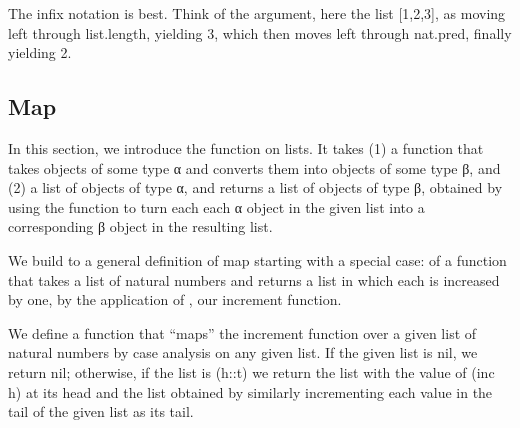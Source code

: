 \documentclass[letterpaper,10pt,english]{sphinxmanual}
\begin{document}
\begin{sphinxVerbatim}[commandchars=\\\{\}]
  \PYG{o}{[}\PYG{o}{]} 
 \PYG{o}{[}\PYG{o}{]}      
            

    \PYG{o}{[}\PYG{o}{]}
    \PYG{o}{[}\PYG{o}{]}
\end{sphinxVerbatim}

\sphinxAtStartPar
The infix notation is best. Think of the argument, here the
list {[}1,2,3{]}, as moving left through list.length, yielding 3,
which then moves left through nat.pred, finally yielding 2.


\subsection{Map}
\label{\detokenize{A_03_Recursive_Types:map}}
\sphinxAtStartPar
In this section, we introduce the  function on lists.
It takes (1) a function that takes objects of some type
α and converts them into objects of some type β, and (2) a
list of objects of type α, and returns a list of objects
of type β, obtained by using the function to turn each each
α object in the given list into a corresponding β object
in the resulting list.

\sphinxAtStartPar
We build to a general definition of map starting with a
special case: of a function that takes a list of natural
numbers and returns a list in which each is increased by
one, by the application of , our increment function.

\sphinxAtStartPar
We define a function that “maps” the increment function
over a given list of natural numbers by case analysis on
any given list. If the given list is nil, we return nil;
otherwise, if the list is (h::t) we return the list with
the value of (inc h) at its head and the list obtained
by similarly incrementing each value in the tail of the
given list as its tail.
\end{document}
